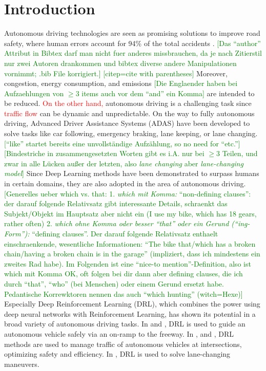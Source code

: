 \documentclass[review]{elsarticle}
\providecommand{\red}[1]{\textcolor{red}{#1}}
\providecommand{\green}[1]{\textcolor{green}{#1}}
\providecommand{\martin}[1]{\red{#1}} %
\providecommand{\martinc}[1]{\green{[#1]}} %
\providecommand{\3}{{\ss}}
\begin{document}
\section{Introduction}
Autonomous driving technologies are seen as promising solutions to
improve road safety, where human errors account for 94\% of the total
accidents \citep{vehicleCrashSurvey2015}.  
\martinc{Das ``author'' Attribut in Bibtex darf man nicht
  fuer anderes missbrauchen, da je nach Zitierstil nur zwei Autoren
  drankommen und bibtex diverse andere Manipulationen vornimmt; .bib
  File korrigiert.}
  \martinc{citep=cite with parentheses}
Moreover, congestion, energy
consumption, and emissions \martinc{Die Englaender haben bei
  Aufzaehlungen von $\ge 3$ items auch vor dem ``and'' ein Komma} are intended to be reduced. 
\martin{On the other hand,} autonomous driving is a challenging task
since \martin{traffic flow} can be dynamic and unpredictable.
On the way to fully autonomous driving, Advanced Driver Assistance Systems
(ADAS) have been developed to solve tasks like car following, emergency
braking, lane keeping, or lane changing. \martinc{``like'' startet
  bereits eine unvollst\"andige Aufz\"ahlung, so no need for ``etc.''}
\martinc{Bindestriche in zusammengesetzten Worten gibt es i.A. nur bei 
  $\ge 3$ Teilen, und zwar in alle L\"ucken au\3er der letzten, also
  \emph{lane changing} aber \emph{lane-changing model}}
Since Deep Learning methods have been demonstrated to surpass humans
in certain domains, they are also adopted in the area of autonomous
driving.
\martinc{Generelles ueber which vs. that: 
1. \emph{which mit Komma:}
  ``non-defining clauses'': der darauf folgende Relativsatz gibt interessante Details,
  schraenkt das Subjekt/Objekt im Hauptsatz aber nicht ein (I use my bike, which has 18
  gears, rather often)
2. \emph{which ohne Komma oder besser ``that'' oder ein Gerund (``ing-Form''):} ``defining clauses''. Der darauf folgende Relativsatz enthaelt einschraenkende,
wesentliche Informationen: ``The bike that/which has a
broken chain/having a broken chain is in the garage'' (impliziert,
dass ich mindestens ein zweites Rad habe). Im Folgenden ist eine ``nice-to
mention''-Definition, also ist which mit Komma OK, oft folgen bei dir dann
aber defining clauses, die ich durch ``that'', ``who'' (bei Menschen)
oder einem Gerund ersetzt habe. Pedantische Korrewktoren nennen das
auch ``which hunting'' (witch=Hexe)}
Especially Deep Reinforcement Learning (DRL), which combines the power
using deep neural networks with Reinforcement Learning, has shown its potential in a broad variety of autonomous driving tasks. 
In \cite{OnRampMerge2018} and \cite{OnRampMerge2020}, DRL is used to
guide an autonomous vehicle safely via an on-ramp to the freeway. In \cite{intersection1}, \cite{intersection3} and \cite{intersection2}, DRL methods are used to manage traffic of autonomous vehicles at intersections, optimizing safety and efficiency.
In \cite{LangeChange1}, DRL is used to solve lane-changing maneuvers.
\end{document}

